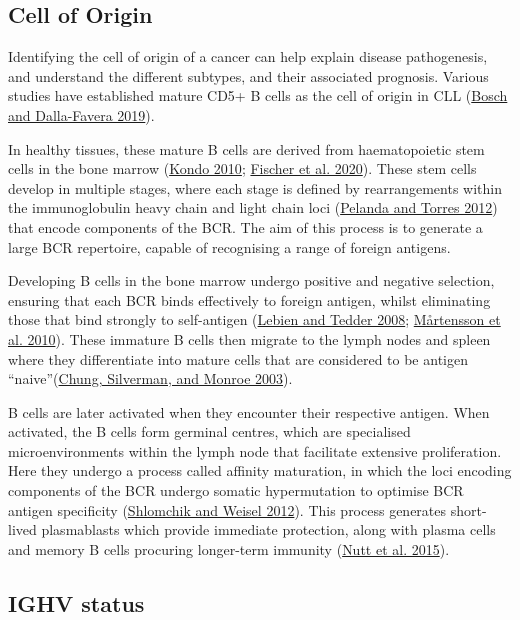 \documentclass[11pt, a4paper, twosided]{book}
\begin{document}
\hypertarget{intro-cell-of-origin}{%
\subsection{Cell of Origin}\label{intro-cell-of-origin}}

Identifying the cell of origin of a cancer can help explain disease pathogenesis, and understand the different subtypes, and their associated prognosis. Various studies have established mature CD5+ B cells as the cell of origin in CLL (\protect\hyperlink{ref-Bosch2019}{Bosch and Dalla-Favera 2019}).

In healthy tissues, these mature B cells are derived from haematopoietic stem cells in the bone marrow (\protect\hyperlink{ref-Kondo2010}{Kondo 2010}; \protect\hyperlink{ref-Fischer2020}{Fischer et al. 2020}). These stem cells develop in multiple stages, where each stage is defined by rearrangements within the immunoglobulin heavy chain and light chain loci (\protect\hyperlink{ref-Pelanda2012}{Pelanda and Torres 2012}) that encode components of the BCR. The aim of this process is to generate a large BCR repertoire, capable of recognising a range of foreign antigens.

Developing B cells in the bone marrow undergo positive and negative selection, ensuring that each BCR binds effectively to foreign antigen, whilst eliminating those that bind strongly to self-antigen (\protect\hyperlink{ref-Lebien2008}{Lebien and Tedder 2008}; \protect\hyperlink{ref-Martensson2010}{Mårtensson et al. 2010}). These immature B cells then migrate to the lymph nodes and spleen where they differentiate into mature cells that are considered to be antigen ``naive''(\protect\hyperlink{ref-Chung2003}{Chung, Silverman, and Monroe 2003}).

B cells are later activated when they encounter their respective antigen. When activated, the B cells form germinal centres, which are specialised microenvironments within the lymph node that facilitate extensive proliferation. Here they undergo a process called affinity maturation, in which the loci encoding components of the BCR undergo somatic hypermutation to optimise BCR antigen specificity (\protect\hyperlink{ref-Shlomchik2012}{Shlomchik and Weisel 2012}). This process generates short-lived plasmablasts which provide immediate protection, along with plasma cells and memory B cells procuring longer-term immunity (\protect\hyperlink{ref-Nutt2015}{Nutt et al. 2015}).

\hypertarget{intro-ighv-status}{%
\subsection{IGHV status}\label{intro-ighv-status}}
\end{document}
